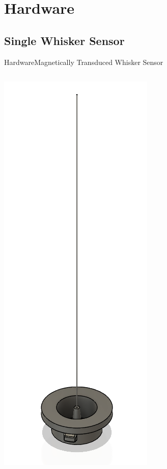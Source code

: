 \documentclass[AIRbeamer
,optEnglish
,optBiber
,optBibstyleAlphabetic
,optBeamerClassicFormat%
]{AIRlatex}
\begin{document}
    \section{Hardware}

    \subsection{Single Whisker Sensor}

    \begin{frame}[c]{Hardware}{Magnetically Transduced Whisker Sensor}
        \begin{columns}[c,onlytextwidth]
            \centering
            \includegraphics[height=0.6\textheight]{figures/whisker}\\

\end{columns}
\end{frame}
\end{document}
